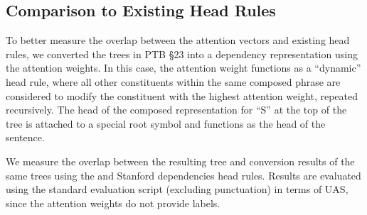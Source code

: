 \documentclass[11pt]{article}
\newcommand{\miguelcomment}[1]{\textcolor{red}{{\textbf{[#1 --\textsc{miguel}]}}}}
\renewcommand{\miguelcomment}[1]{}
\begin{document}



\subsection{Comparison to Existing Head Rules}

To better measure the overlap between the attention vectors and existing head rules, we converted the trees in PTB \S23 into a dependency representation using the attention weights. In this case, the attention weight functions as a ``dynamic'' head rule, where all other constituents within the same composed phrase are considered to modify the constituent with the highest attention weight, repeated recursively. The head of the composed representation for ``S'' at the top of the tree is attached to a special root symbol and functions as the head of the sentence. \miguelcomment{Also, see my comments about Stanford, Collins and Johansson's above... it seems that we are probably more similar to Johansson's. I sent the conversion tool months ago. Not sure if there is time to evaluate there.}

We measure the overlap between the resulting tree and conversion results of the same trees using the  and Stanford dependencies \cite{demarneffe-06} head rules. Results are evaluated using the standard evaluation script (excluding punctuation) in terms of UAS, since the attention weights do not provide labels.
\end{document}
